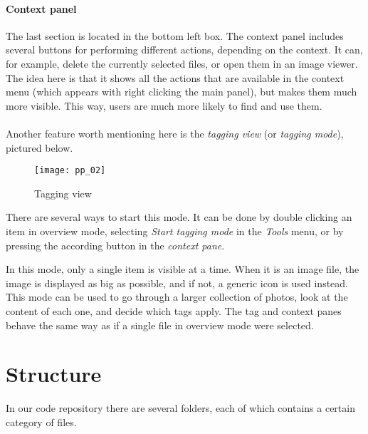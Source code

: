 \paragraph{Context panel} The last section is located in the bottom left box.
The context panel includes several buttons for performing different actions,
depending on the context. It can, for example, delete the currently selected
files, or open them in an image viewer. The idea here is that it shows all the
actions that are available in the context menu (which appears with right
clicking the main panel), but makes them much more visible. This way, users are
much more likely to find and use them.

\paragraph{}
Another feature worth mentioning here is the \emph{tagging view} (or
\emph{tagging mode}), pictured below. %

\begin{figure}[!h]
	\centering
	\texttt{[image: pp\_02]}
	\caption{Tagging view}
\end{figure}

There are several ways to start this mode. It can be done by double clicking
an item in overview mode, selecting \emph{Start tagging mode} in the 
\emph{Tools} menu, or by pressing the according button in the \emph{context pane}. 

In this mode, only a single item is visible at a time.
When it is an image file, the image is displayed as big as
possible, and if not, a generic icon is used instead. This mode can be used to
go through a larger collection of photos, look at the content of each one, and
decide which tags apply. The tag and context panes behave the same way as if
a single file in overview mode were selected.




\section{Structure}
\def\kapitelautor{Clemens Stadlbauer}

In our code repository there are several folders, each of which contains a
certain category of files.

